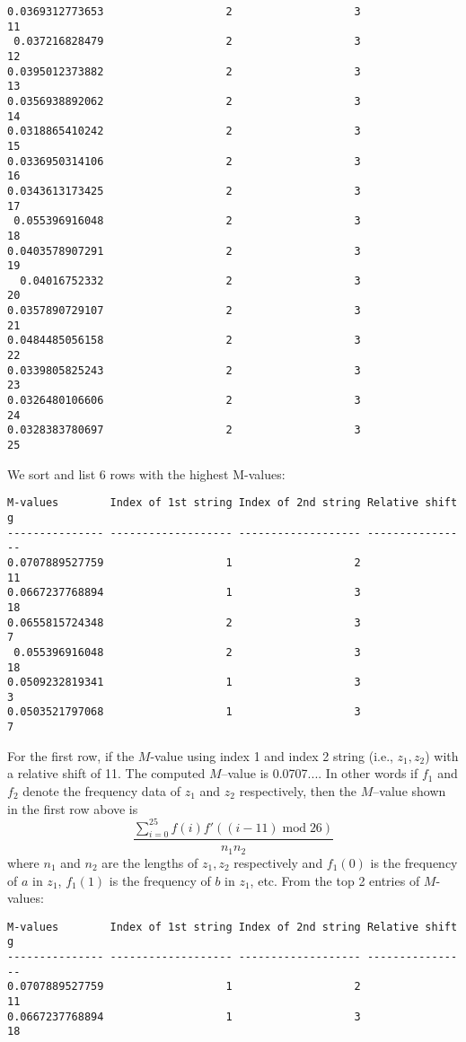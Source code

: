 \begin{Verbatim}[fontsize=\scriptsize,frame=single]
0.0369312773653                   2                   3               11
 0.037216828479                   2                   3               12
0.0395012373882                   2                   3               13
0.0356938892062                   2                   3               14
0.0318865410242                   2                   3               15
0.0336950314106                   2                   3               16
0.0343613173425                   2                   3               17
 0.055396916048                   2                   3               18
0.0403578907291                   2                   3               19
  0.04016752332                   2                   3               20
0.0357890729107                   2                   3               21
0.0484485056158                   2                   3               22
0.0339805825243                   2                   3               23
0.0326480106606                   2                   3               24
0.0328383780697                   2                   3               25
\end{Verbatim}
We sort and list 6 rows with the highest M-values:
\begin{Verbatim}[frame=single, fontsize=\scriptsize]
M-values        Index of 1st string Index of 2nd string Relative shift g
--------------- ------------------- ------------------- ----------------
0.0707889527759                   1                   2               11
0.0667237768894                   1                   3               18
0.0655815724348                   2                   3                7
 0.055396916048                   2                   3               18
0.0509232819341                   1                   3                3
0.0503521797068                   1                   3                7
\end{Verbatim} 
For the first row, if the $M$-value using index 1 and index 2 string
(i.e., $z_1, z_2$)
with a relative shift of 11. The computed $M$--value is 0.0707....
In other words if $f_1$ and $f_2$  denote the frequency data of
$z_1$ and $z_2$ respectively,
then the $M$--value shown in the first row above is
\[
\frac{\sum_{i=0}^{25} f(i)f'((i - 11) \operatorname{mod} 26) }
     {n_1n_2}
\]
where $n_1$ and $n_2$ are the lengths of $z_1, z_2$ respectively
and
$f_1(0)$ is the frequency of $a$ in $z_1$,
$f_1(1)$ is the frequency of $b$ in $z_1$,
etc.
From the top 2 entries of $M$-values:
\begin{Verbatim}[frame=single, fontsize=\scriptsize]
M-values        Index of 1st string Index of 2nd string Relative shift g
--------------- ------------------- ------------------- ----------------
0.0707889527759                   1                   2               11
0.0667237768894                   1                   3               18
\end{Verbatim} 
